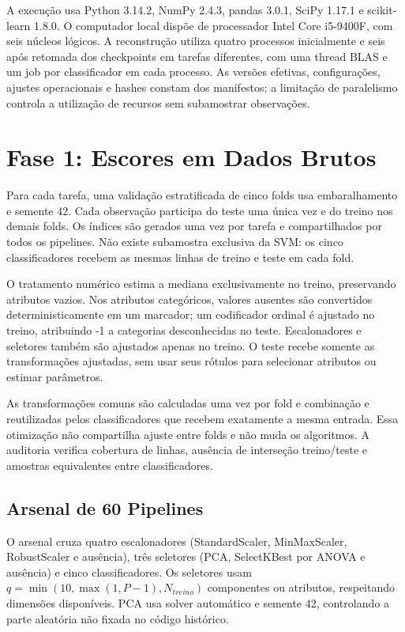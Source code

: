 A execução usa Python 3.14.2, NumPy 2.4.3, pandas 3.0.1, SciPy 1.17.1 e scikit-learn 1.8.0. O computador local dispõe de processador Intel Core i5-9400F, com seis núcleos lógicos. A reconstrução utiliza quatro processos inicialmente e seis após retomada dos checkpoints em tarefas diferentes, com uma thread BLAS e um job por classificador em cada processo. As versões efetivas, configurações, ajustes operacionais e hashes constam dos manifestos; a limitação de paralelismo controla a utilização de recursos sem subamostrar observações.

\section{Fase 1: Escores em Dados Brutos}

Para cada tarefa, uma validação estratificada de cinco folds usa embaralhamento e semente 42. Cada observação participa do teste uma única vez e do treino nos demais folds. Os índices são gerados uma vez por tarefa e compartilhados por todos os pipelines. Não existe subamostra exclusiva da SVM: os cinco classificadores recebem as mesmas linhas de treino e teste em cada fold.

O tratamento numérico estima a mediana exclusivamente no treino, preservando atributos vazios. Nos atributos categóricos, valores ausentes são convertidos deterministicamente em um marcador; um codificador ordinal é ajustado no treino, atribuindo -1 a categorias desconhecidas no teste. Escalonadores e seletores também são ajustados apenas no treino. O teste recebe somente as transformações ajustadas, sem usar seus rótulos para selecionar atributos ou estimar parâmetros.

As transformações comuns são calculadas uma vez por fold e combinação e reutilizadas pelos classificadores que recebem exatamente a mesma entrada. Essa otimização não compartilha ajuste entre folds e não muda os algoritmos. A auditoria verifica cobertura de linhas, ausência de interseção treino/teste e amostras equivalentes entre classificadores.

\subsection{Arsenal de 60 Pipelines}

O arsenal cruza quatro escalonadores (StandardScaler, MinMaxScaler, RobustScaler e ausência), três seletores (PCA, SelectKBest por ANOVA e ausência) e cinco classificadores. Os seletores usam $q=\min(10,\max(1,P-1),N_{treino})$ componentes ou atributos, respeitando dimensões disponíveis. PCA usa solver automático e semente 42, controlando a parte aleatória não fixada no código histórico.

